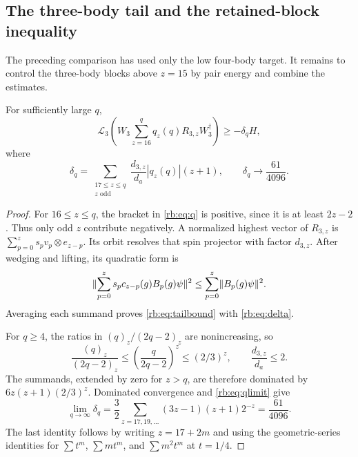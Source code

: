 \subsection{The three-body tail and the retained-block inequality}
\label{rb:sec:finish}
The preceding comparison has used only the low four-body target.
It remains to control the three-body blocks above $z=15$ by pair energy
and combine the estimates.

\begin{lemma}\label{rb:lem:tail}
For sufficiently large $q$,
\begin{equation}\label{rb:eq:tailbound}
 \mathcal L_3\left(W_3\sum_{z=16}^q q_z(q)R_{3,z}W_3^\dagger\right)
 \ge-\delta_qH,
\end{equation}
where
\begin{equation}\label{rb:eq:delta}
 \delta_q=\sum_{\substack{17\le z\le q\\z\text{ odd}}}
       \frac{d_{3,z}}{d_a}|q_z(q)|(z+1),\qquad
 \delta_q\longrightarrow\frac{61}{4096}.
\end{equation}
\end{lemma}
\begin{proof}
For $16\le z\le q$, the bracket in \eqref{rb:eq:q} is positive, since it is at least $2z-2$. Thus only odd $z$ contribute negatively. A normalized highest vector of $R_{3,z}$ is $\sum_{p=0}^zs_pv_p\otimes e_{z-p}$. Its orbit resolves that spin projector with factor $d_{3,z}$. After wedging and lifting, its quadratic form is
\[
 \lVert \sum_{p=0}^zs_pc_{z-p}(g)B_p(g)\psi\rVert^2
 \le\sum_{p=0}^z\lVert B_p(g)\psi\rVert^2.
\]
Averaging each summand proves \eqref{rb:eq:tailbound} with \eqref{rb:eq:delta}.

For $q\ge4$, the ratios in $(q)_z/(2q-2)_z$ are nonincreasing, so
\[
 \frac{(q)_z}{(2q-2)_z}\le\left(\frac q{2q-2}\right)^z
 \le(2/3)^z,\qquad \frac{d_{3,z}}{d_a}\le2.
\]
The summands, extended by zero for $z>q$, are therefore dominated by
$6z(z+1)(2/3)^z$. Dominated convergence and \eqref{rb:eq:qlimit} give
\[
 \lim_{q\to\infty}\delta_q
 =\frac32\sum_{z=17,19,\ldots}(3z-1)(z+1)2^{-z}
 =\frac{61}{4096}.
\]
The last identity follows by writing $z=17+2m$ and using the geometric-series identities for $\sum t^m$, $\sum mt^m$, and $\sum m^2t^m$ at $t=1/4$.
\end{proof}



